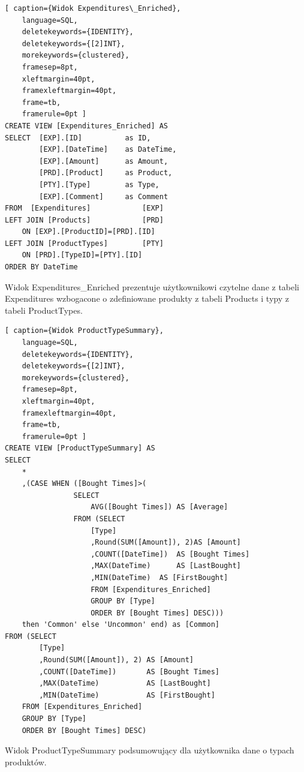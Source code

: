 \documentclass[a4paper,10pt]{report}
\begin{document}

\begin{minipage}{\textwidth}
\begin{lstlisting}[ caption={Widok Expenditures\_Enriched},
    language=SQL,
    deletekeywords={IDENTITY},
    deletekeywords={[2]INT},
    morekeywords={clustered},
    framesep=8pt,
    xleftmargin=40pt,
    framexleftmargin=40pt,
    frame=tb,
    framerule=0pt ]
CREATE VIEW [Expenditures_Enriched] AS
SELECT  [EXP].[ID]          as ID,
        [EXP].[DateTime]    as DateTime,
        [EXP].[Amount]      as Amount,
        [PRD].[Product]     as Product,
        [PTY].[Type]        as Type,
        [EXP].[Comment]     as Comment
FROM  [Expenditures]            [EXP]
LEFT JOIN [Products]            [PRD]	
    ON [EXP].[ProductID]=[PRD].[ID]
LEFT JOIN [ProductTypes]        [PTY]
    ON [PRD].[TypeID]=[PTY].[ID]
ORDER BY DateTime
\end{lstlisting}
{Widok Expenditures\_Enriched prezentuje użytkownikowi czytelne dane z tabeli 
Expenditures wzbogacone o zdefiniowane produkty z tabeli Products i typy z 
tabeli ProductTypes.}
\end{minipage}

\begin{minipage}{\textwidth}
\begin{lstlisting}[ caption={Widok ProductTypeSummary},
    language=SQL,
    deletekeywords={IDENTITY},
    deletekeywords={[2]INT},
    morekeywords={clustered},
    framesep=8pt,
    xleftmargin=40pt,
    framexleftmargin=40pt,
    frame=tb,
    framerule=0pt ]
CREATE VIEW [ProductTypeSummary] AS
SELECT 
	*
	,(CASE WHEN ([Bought Times]>(
                SELECT 
                    AVG([Bought Times]) AS [Average] 
                FROM (SELECT
                    [Type]
                    ,Round(SUM([Amount]), 2)AS [Amount]
                    ,COUNT([DateTime])  AS [Bought Times]
                    ,MAX(DateTime)      AS [LastBought]
                    ,MIN(DateTime)  AS [FirstBought]
                    FROM [Expenditures_Enriched]
                    GROUP BY [Type]
                    ORDER BY [Bought Times] DESC)))
	then 'Common' else 'Uncommon' end) as [Common]
FROM (SELECT
        [Type]
        ,Round(SUM([Amount]), 2) AS [Amount]
        ,COUNT([DateTime])       AS [Bought Times]
        ,MAX(DateTime)           AS [LastBought]
        ,MIN(DateTime)           AS [FirstBought]
    FROM [Expenditures_Enriched]
    GROUP BY [Type]
    ORDER BY [Bought Times] DESC)
\end{lstlisting}
{Widok ProductTypeSummary podsumowujący dla użytkownika dane o typach produktów.}
\end{minipage}
\end{document}
